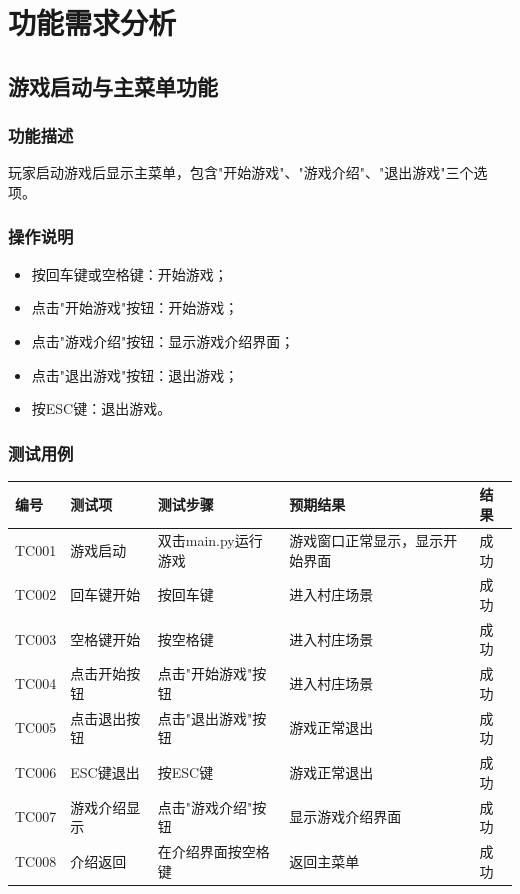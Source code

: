 \documentclass[a4paper,12pt]{article}
\begin{document}
\section{功能需求分析}

\subsection{游戏启动与主菜单功能}

\subsubsection{功能描述}
玩家启动游戏后显示主菜单，包含"开始游戏"、"游戏介绍"、"退出游戏"三个选项。

\subsubsection{操作说明}
\begin{itemize}[leftmargin=2em]
    \item 按回车键或空格键：开始游戏；
    \item 点击"开始游戏"按钮：开始游戏；
    \item 点击"游戏介绍"按钮：显示游戏介绍界面；
    \item 点击"退出游戏"按钮：退出游戏；
    \item 按ESC键：退出游戏。
\end{itemize}

\subsubsection{测试用例}
\begin{longtable}{p{1.2cm} p{2.8cm} p{4cm} p{3.5cm} p{1.5cm}}
\toprule
\textbf{编号} & \textbf{测试项} & \textbf{测试步骤} & \textbf{预期结果} & \textbf{结果} \\
\midrule
\endhead
TC001 & 游戏启动 & 双击main.py运行游戏 & 游戏窗口正常显示，显示开始界面 & 成功 \\
TC002 & 回车键开始 & 按回车键 & 进入村庄场景 & 成功 \\
TC003 & 空格键开始 & 按空格键 & 进入村庄场景 & 成功 \\
TC004 & 点击开始按钮 & 点击"开始游戏"按钮 & 进入村庄场景 & 成功 \\
TC005 & 点击退出按钮 & 点击"退出游戏"按钮 & 游戏正常退出 & 成功 \\
TC006 & ESC键退出 & 按ESC键 & 游戏正常退出 & 成功 \\
TC007 & 游戏介绍显示 & 点击"游戏介绍"按钮 & 显示游戏介绍界面 & 成功 \\
TC008 & 介绍返回 & 在介绍界面按空格键 & 返回主菜单 & 成功 \\
\bottomrule
\end{longtable}
\end{document}
